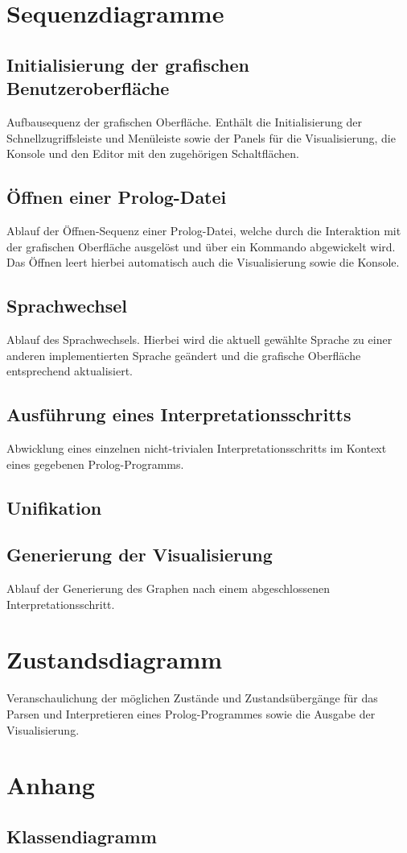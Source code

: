 \documentclass[parskip=full,11pt,twoside]{scrartcl}
\begin{document}
\section{Sequenzdiagramme}

\subsection{Initialisierung der grafischen Benutzeroberfläche}

Aufbausequenz der grafischen Oberfläche. Enthält die Initialisierung der Schnellzugriffsleiste und Menüleiste sowie der Panels für die Visualisierung, die Konsole und den Editor mit den zugehörigen Schaltflächen.

\subsection{Öffnen einer Prolog-Datei}

Ablauf der Öffnen-Sequenz einer Prolog-Datei, welche durch die Interaktion mit der grafischen Oberfläche ausgelöst und über ein Kommando abgewickelt wird. Das Öffnen leert hierbei automatisch auch die Visualisierung sowie die Konsole.

\subsection{Sprachwechsel}

Ablauf des Sprachwechsels. Hierbei wird die aktuell gewählte Sprache zu einer anderen implementierten Sprache geändert und die grafische Oberfläche entsprechend aktualisiert.

\subsection{Ausführung eines Interpretationsschritts}

Abwicklung eines einzelnen nicht-trivialen Interpretationsschritts im Kontext eines gegebenen Prolog-Programms.

\subsection{Unifikation}

\subsection{Generierung der Visualisierung}

Ablauf der Generierung des Graphen nach einem abgeschlossenen Interpretationsschritt. 

\section{Zustandsdiagramm}

Veranschaulichung der möglichen Zustände und Zustandsübergänge für das Parsen und Interpretieren eines Prolog-Programmes sowie die Ausgabe der Visualisierung.

\appendix

\section{Anhang}

\subsection{Klassendiagramm}
\end{document}
